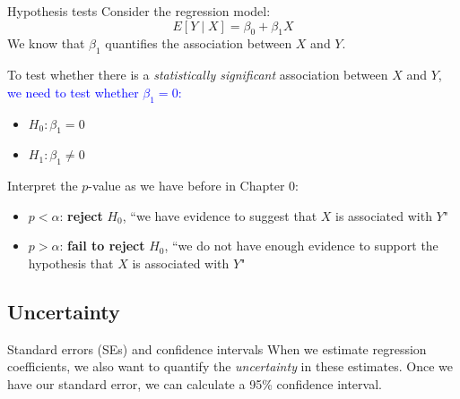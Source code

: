\documentclass[10pt,t]{beamer}
\begin{document}
\begin{frame}{Hypothesis tests}
Consider the regression model:
$$
E[Y \mid X] = \beta_0 + \beta_1 X
$$
We know that $\beta_1$ quantifies the association between $X$ and $Y$.

\vspace{0.3cm}

To test whether there is a \textit{statistically significant} association between $X$ and $Y$, \textcolor{blue}{we need to test whether $\beta_1 = 0$:}

\begin{itemize}
	\item $H_0: \beta_1 = 0$
	\item $H_1: \beta_1 \neq 0$
\end{itemize}

\vspace{0.3cm}

Interpret the $p$-value as we have before in Chapter 0:
\begin{itemize}
	\item $p < \alpha$: \textbf{reject} $H_0$, ``we have evidence to suggest that $X$ is associated with $Y$"
	\item $p > \alpha$: \textbf{fail to reject} $H_0$, ``we do not have enough evidence to support the hypothesis that $X$ is associated with $Y$"
\end{itemize}

\end{frame}

\subsection{Uncertainty}

\begin{frame}{Standard errors (SEs) and confidence intervals}
When we estimate regression coefficients, we also want to quantify the \textit{uncertainty} in these estimates. Once we have our standard error, we can calculate a 95\% confidence interval.


\end{frame}
\end{document}
